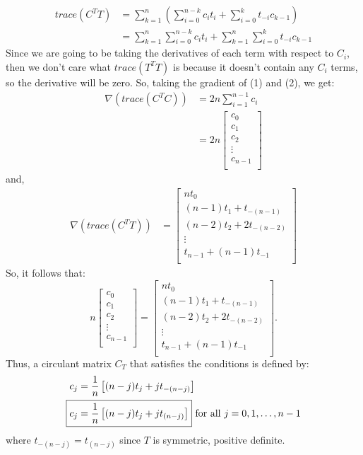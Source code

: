 \documentclass[12pt]{article}
\begin{document}
\begin{align}
trace(C^TT) &= \sum\limits_{k=1}^n\left(\sum\limits_{i=0}^{n-k} c_it_i + \sum\limits_{i=0}^k t_{-i}c_{k-1}\right) \nonumber \\
&= \sum\limits_{k=1}^n\sum\limits_{i=0}^{n-k} c_it_i + \sum\limits_{k=1}^n\sum\limits_{i=0}^{k} t_{-i}c_{k-1}
\end{align}
\noindent
Since we are going to be taking the derivatives of each term with respect to $C_i$, then we don't care what $trace(T^TT)$ is because it doesn't contain any $C_i$ terms, so the derivative will be zero.  So, taking the gradient of (1) and (2), we get:
\begin{align}
\nabla(trace(C^TC)) &= 2n\sum\limits_{i=1}^{n-1} c_i \nonumber \\
&= 2n\begin{bmatrix}
		c_0 \\
		c_1 \\
		c_2 \\
		\vdots \\
		c_{n-1} \\
	\end{bmatrix} \nonumber
\end{align}
\noindent
and,
\begin{align}
\nabla(trace(C^TT)) &= \begin{bmatrix}
						nt_0 \\
						(n-1)t_1 + t_{-(n-1)} \\
						(n-2)t_2 + 2t_{-(n-2)} \\
						\vdots \\
						t_{n-1} + (n-1)t_{-1} \\
						\end{bmatrix} \nonumber
\end{align}
\noindent
So, it follows that:
$$n\begin{bmatrix}
		c_0 \\
		c_1 \\
		c_2 \\
		\vdots \\
		c_{n-1} \\
	\end{bmatrix} = \begin{bmatrix}
						nt_0 \\
						(n-1)t_1 + t_{-(n-1)} \\
						(n-2)t_2 + 2t_{-(n-2)} \\
						\vdots \\
						t_{n-1} + (n-1)t_{-1} \\
						\end{bmatrix}.$$
\noindent						
Thus, a circulant matrix $C_T$ that satisfies the conditions is defined by:
\begin{align}
c_j &= \frac{1}{n}\left[(n-j)t_j + jt_{-(n-j)}\right] \nonumber \\
\Aboxed{c_j &= \frac{1}{n}\left[(n-j)t_j + jt_{(n-j)}\right]} \text{ for all $j=0,1,\dots, n-1$} \nonumber
\end{align}
where $t_{-(n-j)} = t_{(n-j)}$ since $T$ is symmetric, positive definite.\\
\end{document}
